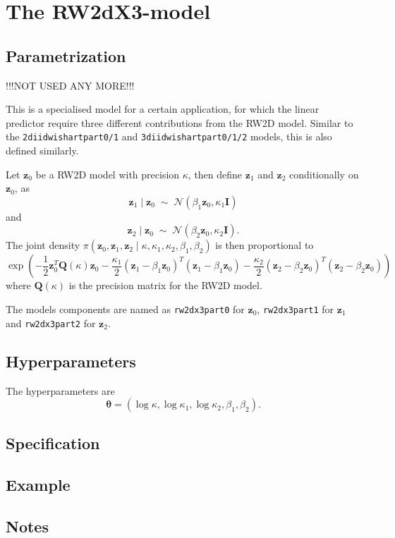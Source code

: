 \documentclass[a4paper,11pt]{article}
\begin{document}
\section*{The RW2dX3-model}
\subsection*{Parametrization}

!!!NOT USED ANY MORE!!!

\clearpage

This is a specialised model for a certain application, for which the
linear predictor require three different contributions from the RW2D
model. Similar to the {\tt 2diidwishartpart0/1} and
{\tt 3diidwishartpart0/1/2} models, this is also defined similarly.

Let $\mathbf{z}_{0}$ be a RW2D model with precision $\kappa$, then define
$\mathbf{z}_{1}$ and $\mathbf{z}_{2}$ conditionally on $\mathbf{z}_{0}$, as
\begin{displaymath}
    \mathbf{z}_{1} \mid \mathbf{z}_{0} \;\sim\; {\mathcal N}( \beta_{1}
    \mathbf{z}_{0}, \kappa_{1}\mathbf{I})                                    
\end{displaymath}
and 
\begin{displaymath}
    \mathbf{z}_{2} \mid \mathbf{z}_{0} \;\sim\; {\mathcal N}( \beta_{2}
    \mathbf{z}_{0}, \kappa_{2}\mathbf{I}).
\end{displaymath}
The joint density $\pi(\mathbf{z}_{0}, \mathbf{z}_{1}, \mathbf{z}_{2} \mid \kappa,
\kappa_{1}, \kappa_{2}, \beta_{1}, \beta_{2})$ is then proportional to
\begin{displaymath}
    \exp\left(
      -\frac{1}{2} \mathbf{z}_{0}^{T}\mathbf{Q}(\kappa) \mathbf{z}_{0}
      -\frac{\kappa_{1}}{2} (\mathbf{z}_{1} - \beta_{1}\mathbf{z}_{0})^{T}
      (\mathbf{z}_{1} - \beta_{1}\mathbf{z}_{0})
      -\frac{\kappa_{2}}{2} (\mathbf{z}_{2} - \beta_{2}\mathbf{z}_{0})^{T}
      (\mathbf{z}_{2} - \beta_{2}\mathbf{z}_{0})\right)
\end{displaymath}
where $\mathbf{Q}(\kappa)$ is the precision matrix for the RW2D model.

The models components are named as {\tt rw2dx3part0} for
$\mathbf{z}_{0}$, {\tt rw2dx3part1} for $\mathbf{z}_{1}$ and
{\tt rw2dx3part2} for $\mathbf{z}_{2}$. 


\subsection*{Hyperparameters}

The hyperparameters are
\begin{displaymath}
    \mathbf{\theta} = (\log \kappa, \log \kappa_{1}, \log \kappa_{2}, \beta_{1}, \beta_{2}).
\end{displaymath}

\subsection*{Specification}
\subsection*{Example}
\subsection*{Notes}
\end{document}
